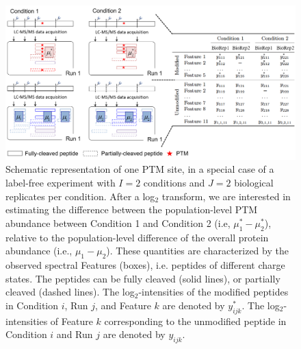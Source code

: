 \documentclass[mcp]{article}
\numberwithin{table}{section}
\begin{document}
\begin{figure}[ht]
\centering
\includegraphics[scale=.45]{images/fig3.png}
\caption{Schematic representation of one PTM site, in a special case of a label-free experiment with $I=2$ conditions and $J=2$ biological replicates per condition. After a log$_2$ transform, we are interested in estimating the difference between the population-level PTM abundance between Condition 1 and Condition 2 (i.e, $\mu^*_1-\mu^*_2$), relative to the population-level difference of the overall protein abundance (i.e., $\mu_1-\mu_2$).  These quantities are characterized by the observed spectral Features (boxes), i.e. peptides of different charge states. The peptides can be fully cleaved (solid lines), or partially cleaved (dashed lines). The log$_2$-intensities of the modified peptides in Condition $i$, Run $j$, and Feature $k$ are denoted by $y_{ijk}^{\ast}$. The log$_2$-intensities of Feature $k$ corresponding to the unmodified peptide in Condition $i$ and Run $j$ are denoted by $y_{ijk}$. }
\label{fig:data-structure}
\end{figure}
\end{document}

